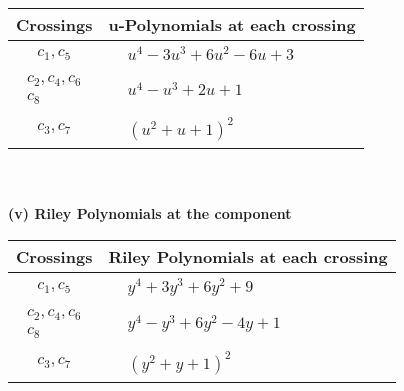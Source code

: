 \documentclass[1p]{elsarticle_modified}
\theoremstyle{definition}
\begin{document}
\begin{tabular}{m{50pt}|m{274pt}}
Crossings & \hspace{64pt}u-Polynomials at each crossing \\
\hline $$\begin{aligned}c_{1},c_{5}\end{aligned}$$&$\begin{aligned}
&u^4-3 u^3+6 u^2-6 u+3
\end{aligned}$\\
\hline $$\begin{aligned}c_{2},c_{4},c_{6}\\c_{8}\end{aligned}$$&$\begin{aligned}
&u^4- u^3+2 u+1
\end{aligned}$\\
\hline $$\begin{aligned}c_{3},c_{7}\end{aligned}$$&$\begin{aligned}
&(u^2+u+1)^2
\end{aligned}$\\
\hline
\end{tabular}\\~\\
\newpage\renewcommand{\arraystretch}{1}
\flushleft \textbf{(v) Riley Polynomials at the component}\newline \\
\begin{tabular}{m{50pt}|m{274pt}}
Crossings & \hspace{64pt}Riley Polynomials at each crossing \\
\hline $$\begin{aligned}c_{1},c_{5}\end{aligned}$$&$\begin{aligned}
&y^4+3 y^3+6 y^2+9
\end{aligned}$\\
\hline $$\begin{aligned}c_{2},c_{4},c_{6}\\c_{8}\end{aligned}$$&$\begin{aligned}
&y^4- y^3+6 y^2-4 y+1
\end{aligned}$\\
\hline $$\begin{aligned}c_{3},c_{7}\end{aligned}$$&$\begin{aligned}
&(y^2+y+1)^2
\end{aligned}$\\
\hline
\end{tabular}\\~\\
\end{document}
